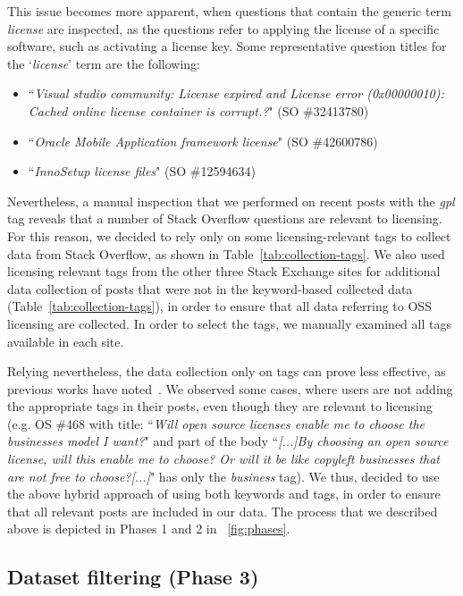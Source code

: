 \documentclass{elsarticle}
\begin{document}
This issue becomes more apparent, when questions that contain the generic term \emph{license} are inspected, as the questions refer to applying the license of a specific software, such as activating a license key. Some representative question titles for the `\emph{license}' term are the following:
\begin{itemize}
    \item ``\emph{Visual studio community: License expired and License error (0x00000010): Cached online license container is corrupt.?}" (SO \#32413780)
    \item ``\emph{Oracle Mobile Application framework license}" (SO \#42600786)
    \item ``\emph{InnoSetup license files}" (SO \#12594634)
\end{itemize}

Nevertheless, a manual inspection that we performed on recent posts with the \emph{gpl} tag reveals that a number of Stack Overflow questions are relevant to licensing. For this reason, we decided to rely only on some licensing-relevant tags to collect data from Stack Overflow, as shown in Table~\ref{tab:collection-tags}. We also used licensing relevant tags from the other three Stack Exchange sites for additional data collection of posts that were not in the keyword-based collected data (Table~\ref{tab:collection-tags}), in order to ensure that all data referring to OSS licensing are collected. In order to select the tags, we manually examined all tags available in each site. 

Relying nevertheless, the data collection only on tags can prove less effective, as previous works have noted~\cite{barua2014developers,tahir2020large}. We observed some cases, where users are not adding the appropriate tags in their posts, even though they are relevant to licensing (e.g. OS \#468 with title: ``\emph{Will open source licenses enable me to choose the businesses model I want?}" and part of the body ``\emph{[...]By choosing an open source license, will this enable me to choose? Or will it be like copyleft businesses that are not free to choose?[...]}" has only the \emph{business} tag). We thus, decided to use the above hybrid approach of using both keywords and tags, in order to ensure that all relevant posts are included in our data. The process that we described above is depicted in Phases 1 and 2 in \figurename~\ref{fig:phases}.



\subsection{Dataset filtering (Phase 3)}
\end{document}
